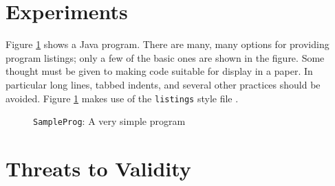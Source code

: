 \section{Experiments}

Figure \ref{javaprog} shows a Java program. There are many, many options for
providing program listings; only a few of the basic ones are shown
in the figure. Some thought must be given to making code suitable
for display in a paper. In particular long lines, tabbed indents, and
several other practices should be avoided. Figure \ref{javaprog} makes
use of the {\tt listings} style file \cite{Heinz:2013}.



\begin{figure}[htbp]
\centering

\caption{{\tt SampleProg}: A very simple program}
\label{javaprog}
\end{figure}

\section{Threats to Validity}

